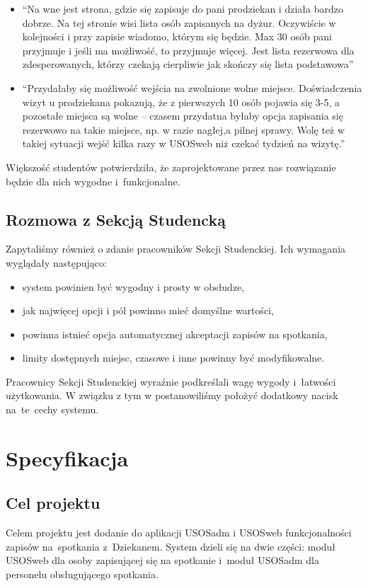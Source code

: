 \documentclass[licencjacka]{pracamgr}
\begin{document}
\begin{itemize}
\begin{itemize}
\item \enquote{Na wne jest strona, gdzie się zapisuje do pani prodziekan i działa bardzo dobrze. Na tej stronie wisi lista osób zapisanych na dyżur. Oczywiście w kolejności i przy zapisie wiadomo, którym się będzie. Max 30 osób pani przyjmuje i jeśli ma możliwość, to przyjmuje więcej. Jest lista rezerwowa dla zdesperowanych, którzy czekają cierpliwie jak skończy się lista podstawowa}
\item \enquote{Przydałaby się możliwość wejścia na zwolnione wolne miejsce. Doświadczenia wizyt u prodziekana pokazują, że z pierwszych 10 osób pojawia się 3-5, a pozostałe miejsca są wolne -- czasem przydatna byłaby opcja zapisania się rezerwowo na takie miejsce, np. w razie nagłej,a pilnej sprawy.  Wolę też w takiej sytuacji wejść kilka razy w USOSweb niż czekać tydzień na wizytę.}
\end{itemize}

\end{itemize}
Większość studentów potwierdziła, że zaprojektowane przez nas rozwiązanie będzie dla nich wygodne i~funkcjonalne.
 
\section{Rozmowa z Sekcją Studencką}
Zapytaliśmy również o zdanie pracowników Sekcji Studenckiej. Ich wymagania wyglądały następująco:
\begin{itemize}
\setlength\itemsep{0,05em}
    \item system powinien być wygodny i prosty w obsłudze,
    \item jak najwięcej opcji i pól powinno mieć domyślne wartości,
    \item powinna istnieć opcja automatycznej akceptacji zapisów na spotkania,
    \item limity dostępnych miejsc, czasowe i inne powinny być modyfikowalne.
\end{itemize}
Pracownicy Sekcji Studenckiej wyraźnie podkreślali wagę wygody i~łatwości użytkowania. W związku z tym w postanowiliśmy położyć dodatkowy nacisk na~te~cechy systemu.


\chapter{Specyfikacja} \label{chap:specyfikacja}

\section{Cel projektu}
Celem projektu jest dodanie do aplikacji USOSadm i USOSweb funkcjonalności zapisów na~spotkania z~Dziekanem. System dzieli się na dwie części: moduł USOSweb dla osoby zapisującej się na spotkanie i~moduł USOSadm dla personelu obsługującego spotkania.
\end{document}
